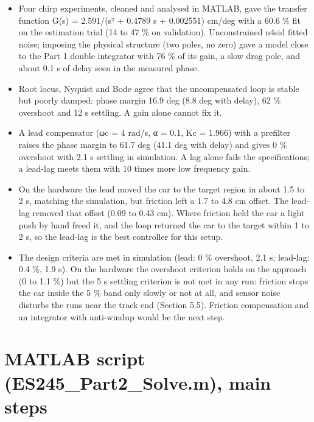 \documentclass[11pt,a4paper]{article}
\providecommand{\tightlist}{\setlength{\itemsep}{0pt}\setlength{\parskip}{0pt}}
\begin{document}
\begin{itemize}
\tightlist
\item
  Four chirp experiments, cleaned and analysed in MATLAB, gave the
  transfer function G(s) = 2.591/(s² + 0.4789 s + 0.002551) cm/deg with
  a 60.6 \% fit on the estimation trial (14 to 47 \% on validation). Unconstrained n4sid fitted noise; imposing the physical
  structure (two poles, no zero) gave a model close to the Part 1 double
  integrator with 76 \% of its gain, a slow drag pole, and about 0.1 s
  of delay seen in the measured phase.
\item
  Root locus, Nyquist and Bode agree that the uncompensated loop is
  stable but poorly damped: phase margin 16.9 deg (8.8 deg with delay),
  62 \% overshoot and 12 s settling. A gain alone cannot fix it.
\item
  A lead compensator (ωc = 4 rad/s, α = 0.1, Kc = 1.966) with a
  prefilter raises the phase margin to 61.7 deg (41.1 deg with delay)
  and gives 0 \% overshoot with 2.1 s settling in simulation. A lag
  alone fails the specifications; a lead-lag meets them with 10 times
  more low frequency gain.
\item
  On the hardware the lead moved the car to the target region in about
  1.5 to 2 s, matching the simulation, but friction left a 1.7 to 4.8 cm
  offset. The lead-lag removed that offset (0.09 to 0.43 cm). Where
  friction held the car a light push by hand freed it, and the loop
  returned the car to the target within 1 to 2 s, so the lead-lag is the best controller for this setup.
\item
  The design criteria are met in simulation (lead: 0 \% overshoot, 2.1 s; lead-lag: 0.4 \%, 1.9 s). On the hardware the overshoot criterion holds on the approach (0 to 1.1 \%) but the 5 s settling criterion is not met in any run: friction stops the car inside the 5 \% band only slowly or not at all, and sensor noise disturbs the runs near the track end (Section 5.5). Friction compensation and an integrator with anti-windup would be the next step.
\end{itemize}

\hypertarget{matlab-script-es245_part2_solve.m-main-steps}{%
\appendix
\section{MATLAB script (ES245\_Part2\_Solve.m), main
steps}\label{matlab-script-es245_part2_solve.m-main-steps}}
\end{document}
